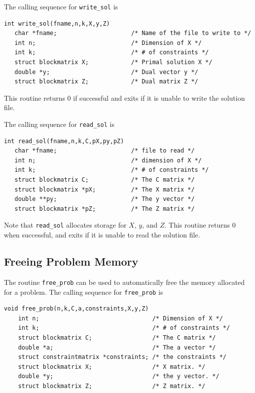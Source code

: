 \documentclass{article}
\begin{document}
The calling sequence for {\tt write\_sol} is 

\begin{verbatim}
int write_sol(fname,n,k,X,y,Z)
   char *fname;                     /* Name of the file to write to */
   int n;                           /* Dimension of X */
   int k;                           /* # of constraints */
   struct blockmatrix X;            /* Primal solution X */
   double *y;                       /* Dual vector y */
   struct blockmatrix Z;            /* Dual matrix Z */
\end{verbatim}
This routine returns 0 if successful and exits if it is unable to write
the solution file.  

The calling sequence for {\tt read\_sol} is 

\begin{verbatim}
int read_sol(fname,n,k,C,pX,py,pZ)
   char *fname;                     /* file to read */
   int n;                           /* dimension of X */
   int k;                           /* # of constraints */
   struct blockmatrix C;            /* The C matrix */
   struct blockmatrix *pX;          /* The X matrix */
   double **py;                     /* The y vector */
   struct blockmatrix *pZ;          /* The Z matrix */
\end{verbatim}
Note that {\tt read\_sol} allocates storage for $X$, $y$, and $Z$.  This
routine returns 0 when successful, and exits if it is unable to read
the solution file.  

\subsection*{Freeing Problem Memory}
The routine {\tt free\_prob} can be used to automatically 
free the memory allocated for a problem.  The calling sequence
for {\tt free\_prob} is

\begin{verbatim}
void free_prob(n,k,C,a,constraints,X,y,Z)
    int n;                                /* Dimension of X */
    int k;                                /* # of constraints */
    struct blockmatrix C;                 /* The C matrix */
    double *a;                            /* The a vector */
    struct constraintmatrix *constraints; /* the constraints */
    struct blockmatrix X;                 /* X matrix. */ 
    double *y;                            /* the y vector. */
    struct blockmatrix Z;                 /* Z matrix. */
\end{verbatim}


 
\end{document}
